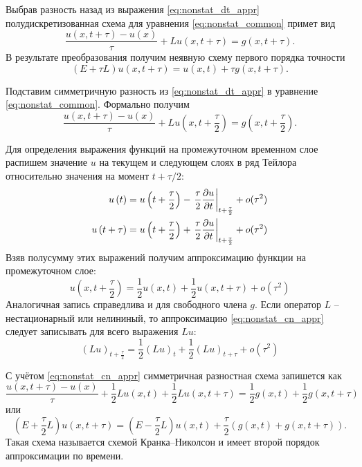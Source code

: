 
Выбрав разность назад из выражения \eqref{eq:nonstat_dt_appr}
полудискретизованная схема для уравнения \eqref{eq:nonstat_common} примет вид
\begin{equation*}
    \frac{u(x, t+\tau) - u(x)}{\tau} + L u(x, t+\tau) = g(x, t+\tau).
\end{equation*}
В результате преобразования получим неявную схему первого порядка точности
\begin{equation}
    \label{eq:nonstat_implicit}
    \left(E+\tau L\right) u(x, t+\tau) = u(x, t) + \tau g(x, t + \tau).
\end{equation}


Подставим симметричную разность из \eqref{eq:nonstat_dt_appr}
в уравнение \eqref{eq:nonstat_common}. Формально получим
\begin{equation*}
    \frac{u(x, t+\tau) - u(x)}{\tau} + L u(x, t+\frac{\tau}{2}) = g(x, t+\frac{\tau}{2}).
\end{equation*}

Для определения выражения функций на промежуточном временном слое
распишем значение $u$ на текущем и следующем слоях в ряд Тейлора
относительно значения на момент $t+\tau/2$:
\begin{align*}
    u\left(t\right)      &= u\left(t+\frac{\tau}{2}\right) - \left.\frac{\tau}{2}\frac{\partial u}{\partial t}\right|_{t+\frac{\tau}{2}} + o(\tau^2)\\
    u\left(t+\tau\right) &= u\left(t+\frac{\tau}{2}\right) + \left.\frac{\tau}{2}\frac{\partial u}{\partial t}\right|_{t+\frac{\tau}{2}} + o(\tau^2)
\end{align*}
Взяв полусумму этих выражений получим аппроксимацию функции на промежуточном слое:
\begin{equation}
    \label{eq:nonstat_cn_appr}
    u\left(x, t + \frac{\tau}{2}\right) = \frac12u\left(x, t\right) + \frac12u\left(x, t+\tau\right) + o(\tau^2)
\end{equation}
Аналогичная запись справедлива и для свободного члена $g$.
Если оператор $L$ -- нестационарный или нелининый, то аппроксимацию \eqref{eq:nonstat_cn_appr}
следует записывать для всего выражения $Lu$:
\begin{equation*}
    \left(Lu\right)_{t+\frac{\tau}{2}} = \frac12\left(Lu\right)_{t} + \frac12\left(Lu\right)_{t+\tau} + o(\tau^2)
\end{equation*}


С учётом \eqref{eq:nonstat_cn_appr} симметричная разностная схема
запишется как
\begin{equation*}
    \frac{u(x, t+\tau) - u(x)}{\tau} + \frac12L u(x, t) + \frac12 L u(x, t + \tau) = \frac12 g(x, t) + \frac12 g(x, t+\tau)
\end{equation*}
или
\begin{equation}
    \label{eq:nonstat_cn}
    \left(E+\frac{\tau}{2} L\right) u(x, t+\tau) = \left(E - \frac{\tau}{2} L\right) u(x, t) + \frac{\tau}{2} \left(g(x, t) + g(x, t + \tau)\right).
\end{equation}
Такая схема называется схемой Кранка--Николсон и имеет второй порядок аппроксимации по времени.

